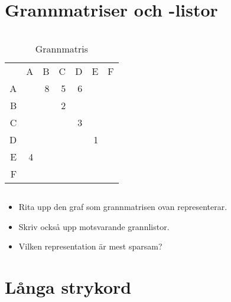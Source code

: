 \mode*


\section{Grannmatriser och -listor}

\begin{frame}
  \begin{columns}[b]
    \begin{column}{0.5\columnwidth}
      \begin{table}
        \begin{tabular}{rrrrrrr}
            & A & B & C & D & E & F \\
          A &   & 8 & 5 & 6 &   &   \\
          B &   &   & 2 &   &   &   \\
          C &   &   &   & 3 &   &   \\
          D &   &   &   &   & 1 &   \\
          E & 4 &   &   &   &   &   \\
          F &   &   &   &   &   &
        \end{tabular}
        \caption{Grannmatris}
      \end{table}
    \end{column}
    \begin{column}{0.5\columnwidth}
    \end{column}
  \end{columns}
  \begin{exercise}
    \begin{itemize}
      \item Rita upp den graf som grannmatrisen ovan representerar.
      \item Skriv också upp motsvarande grannlistor.
      \item Vilken representation är mest sparsam?
    \end{itemize}
  \end{exercise}
\end{frame}


\section{Långa strykord}

